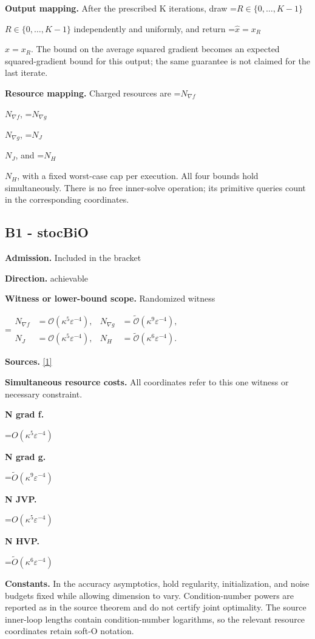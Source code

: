 \documentclass[10pt,a4paper]{article}
\newcommand{\AtlasMath}[1]{\par\begingroup\centering\setbox0=\hbox{$\displaystyle #1$}\ifdim\wd0>1.4\linewidth\typeout{ATLAS WIDE FORMULA: \the\wd0}\fi\ifdim\wd0>\linewidth\resizebox{\linewidth}{!}{\box0}\else\box0\fi\par\endgroup}
\newcommand{\AtlasInlineMath}[1]{\begingroup\setbox0=\hbox{$#1$}\ifdim\wd0>.4\linewidth\endgroup\AtlasMath{#1}\else\endgroup$#1$\fi}
\begin{document}
\textbf{Output mapping.} After the prescribed K iterations, draw \AtlasInlineMath{R\in\{0,\ldots,K-1\}} independently and uniformly, and return \AtlasInlineMath{\widehat x=x_R}. The bound on the average squared gradient becomes an expected squared-gradient bound for this output; the same guarantee is not claimed for the last iterate.

\textbf{Resource mapping.} Charged resources are \AtlasInlineMath{N_{\nabla f}}, \AtlasInlineMath{N_{\nabla g}}, \AtlasInlineMath{N_J}, and \AtlasInlineMath{N_H}, with a fixed worst-case cap per execution. All four bounds hold simultaneously. There is no free inner-solve operation; its primitive queries count in the corresponding coordinates.

\subsection{B1 - stocBiO}
\textbf{Admission.} Included in the bracket

\textbf{Direction.} achievable

\textbf{Witness or lower-bound scope.} Randomized witness

\AtlasMath{\begin{aligned}N_{\nabla f}&=\mathcal O(\kappa^5\varepsilon^{-4}),&N_{\nabla g}&=\widetilde{\mathcal O}(\kappa^9\varepsilon^{-4}),\\N_J&=\mathcal O(\kappa^5\varepsilon^{-4}),&N_H&=\widetilde{\mathcal O}(\kappa^6\varepsilon^{-4}).\end{aligned}}
\textbf{Sources.} \href{https://proceedings.mlr.press/v139/ji21c/ji21c.pdf}{[1]}

\textbf{Simultaneous resource costs.} All coordinates refer to this one witness or necessary constraint.

\textbf{N grad f.}

\AtlasMath{O(\kappa ^5\varepsilon ^{-4})}
\textbf{N grad g.}

\AtlasMath{\widetilde O(\kappa^9\varepsilon^{-4})}
\textbf{N JVP.}

\AtlasMath{O(\kappa ^5\varepsilon ^{-4})}
\textbf{N HVP.}

\AtlasMath{\widetilde O(\kappa ^6\varepsilon ^{-4})}
\textbf{Constants.} In the accuracy asymptotics, hold regularity, initialization, and noise budgets fixed while allowing dimension to vary. Condition-number powers are reported as in the source theorem and do not certify joint optimality. The source inner-loop lengths contain condition-number logarithms, so the relevant resource coordinates retain soft-O notation.
\end{document}
